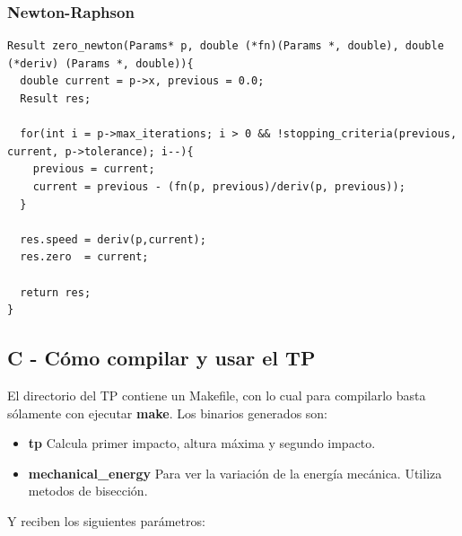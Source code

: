 \documentclass[a4paper]{article}
\begin{document}
\subsubsection{Newton-Raphson}
\begin{verbatim}
Result zero_newton(Params* p, double (*fn)(Params *, double), double (*deriv) (Params *, double)){
  double current = p->x, previous = 0.0;
  Result res;

  for(int i = p->max_iterations; i > 0 && !stopping_criteria(previous, current, p->tolerance); i--){
    previous = current;
    current = previous - (fn(p, previous)/deriv(p, previous));
  }

  res.speed = deriv(p,current);
  res.zero  = current;

  return res;
}
\end{verbatim}

\newpage

\subsection{C - Cómo compilar y usar el TP}
El directorio del TP contiene un Makefile, con lo cual para compilarlo basta sólamente con ejecutar \textbf{make}. Los binarios generados son: 

\begin{itemize}
  \item \textbf{tp} Calcula primer impacto, altura máxima y segundo impacto.
  \item \textbf{mechanical\_energy} Para ver la variación de la energía mecánica. Utiliza metodos de bisección.
\end{itemize}

Y reciben los siguientes parámetros:
\end{document}

